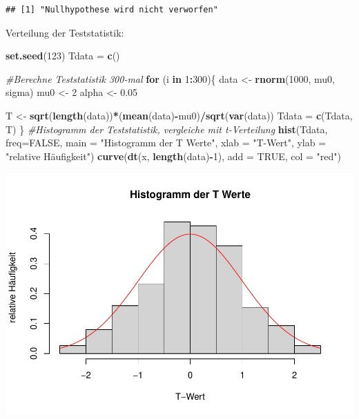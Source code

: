 \documentclass[]{article}
\newenvironment{Shaded}{\begin{snugshade}}{\end{snugshade}}
\newcommand{\CommentTok}[1]{\textcolor[rgb]{0.56,0.35,0.01}{\textit{#1}}}
\newcommand{\ControlFlowTok}[1]{\textcolor[rgb]{0.13,0.29,0.53}{\textbf{#1}}}
\newcommand{\DataTypeTok}[1]{\textcolor[rgb]{0.13,0.29,0.53}{#1}}
\newcommand{\DecValTok}[1]{\textcolor[rgb]{0.00,0.00,0.81}{#1}}
\newcommand{\FloatTok}[1]{\textcolor[rgb]{0.00,0.00,0.81}{#1}}
\newcommand{\KeywordTok}[1]{\textcolor[rgb]{0.13,0.29,0.53}{\textbf{#1}}}
\newcommand{\NormalTok}[1]{#1}
\newcommand{\OperatorTok}[1]{\textcolor[rgb]{0.81,0.36,0.00}{\textbf{#1}}}
\newcommand{\OtherTok}[1]{\textcolor[rgb]{0.56,0.35,0.01}{#1}}
\newcommand{\StringTok}[1]{\textcolor[rgb]{0.31,0.60,0.02}{#1}}
\begin{document}
\begin{verbatim}
## [1] "Nullhypothese wird nicht verworfen"
\end{verbatim}

Verteilung der Teststatistik:

\begin{Shaded}
\begin{Highlighting}[]
\KeywordTok{set.seed}\NormalTok{(}\DecValTok{123}\NormalTok{)}
\NormalTok{Tdata =}\StringTok{ }\KeywordTok{c}\NormalTok{()}

\CommentTok{#Berechne Teststatistik 300-mal}
\ControlFlowTok{for}\NormalTok{ (i }\ControlFlowTok{in} \DecValTok{1}\OperatorTok{:}\DecValTok{300}\NormalTok{)\{}
\NormalTok{  data <-}\StringTok{ }\KeywordTok{rnorm}\NormalTok{(}\DecValTok{1000}\NormalTok{, mu0, sigma)}
\NormalTok{  mu0 <-}\StringTok{ }\DecValTok{2}
\NormalTok{  alpha <-}\StringTok{ }\FloatTok{0.05}

\NormalTok{  T <-}\StringTok{ }\KeywordTok{sqrt}\NormalTok{(}\KeywordTok{length}\NormalTok{(data))}\OperatorTok{*}\NormalTok{(}\KeywordTok{mean}\NormalTok{(data)}\OperatorTok{-}\NormalTok{mu0)}\OperatorTok{/}\KeywordTok{sqrt}\NormalTok{(}\KeywordTok{var}\NormalTok{(data))}
\NormalTok{  Tdata =}\StringTok{ }\KeywordTok{c}\NormalTok{(Tdata, T)}
\NormalTok{\}}
\CommentTok{#Histogramm der Teststatistik, vergleiche mit t-Verteilung}
\KeywordTok{hist}\NormalTok{(Tdata, }\DataTypeTok{freq=}\OtherTok{FALSE}\NormalTok{, }\DataTypeTok{main =} \StringTok{"Histogramm der T Werte"}\NormalTok{,}
     \DataTypeTok{xlab =} \StringTok{"T-Wert"}\NormalTok{, }\DataTypeTok{ylab =} \StringTok{"relative Häufigkeit"}\NormalTok{)}
\KeywordTok{curve}\NormalTok{(}\KeywordTok{dt}\NormalTok{(x, }\KeywordTok{length}\NormalTok{(data)}\OperatorTok{-}\DecValTok{1}\NormalTok{), }\DataTypeTok{add =} \OtherTok{TRUE}\NormalTok{, }\DataTypeTok{col =} \StringTok{"red"}\NormalTok{)}
\end{Highlighting}
\end{Shaded}

\includegraphics{Test_files/figure-latex/unnamed-chunk-5-1.pdf}
\end{document}
